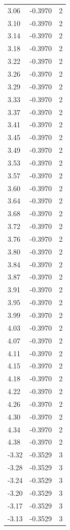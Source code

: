 \begin{longtable}{lrr}
  3.06 & -0.3970 & 2 \\
  3.10 & -0.3970 & 2 \\
  3.14 & -0.3970 & 2 \\
  3.18 & -0.3970 & 2 \\
  3.22 & -0.3970 & 2 \\
  3.26 & -0.3970 & 2 \\
  3.29 & -0.3970 & 2 \\
  3.33 & -0.3970 & 2 \\
  3.37 & -0.3970 & 2 \\
  3.41 & -0.3970 & 2 \\
  3.45 & -0.3970 & 2 \\
  3.49 & -0.3970 & 2 \\
  3.53 & -0.3970 & 2 \\
  3.57 & -0.3970 & 2 \\
  3.60 & -0.3970 & 2 \\
  3.64 & -0.3970 & 2 \\
  3.68 & -0.3970 & 2 \\
  3.72 & -0.3970 & 2 \\
  3.76 & -0.3970 & 2 \\
  3.80 & -0.3970 & 2 \\
  3.84 & -0.3970 & 2 \\
  3.87 & -0.3970 & 2 \\
  3.91 & -0.3970 & 2 \\
  3.95 & -0.3970 & 2 \\
  3.99 & -0.3970 & 2 \\
  4.03 & -0.3970 & 2 \\
  4.07 & -0.3970 & 2 \\
  4.11 & -0.3970 & 2 \\
  4.15 & -0.3970 & 2 \\
  4.18 & -0.3970 & 2 \\
  4.22 & -0.3970 & 2 \\
  4.26 & -0.3970 & 2 \\
  4.30 & -0.3970 & 2 \\
  4.34 & -0.3970 & 2 \\
  4.38 & -0.3970 & 2 \\
  -3.32 & -0.3529 & 3 \\
  -3.28 & -0.3529 & 3 \\
  -3.24 & -0.3529 & 3 \\
  -3.20 & -0.3529 & 3 \\
  -3.17 & -0.3529 & 3 \\
  -3.13 & -0.3529 & 3 \\

\end{longtable}
